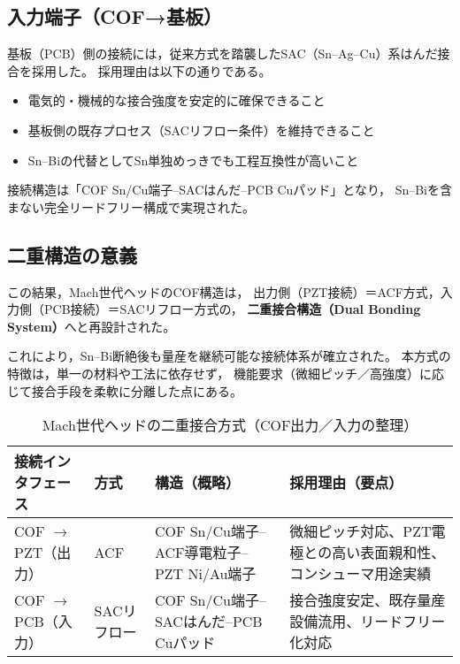 \documentclass[conference]{IEEEtran}
\begin{document}
\subsection{入力端子（COF→基板）}

基板（PCB）側の接続には，従来方式を踏襲したSAC（Sn–Ag–Cu）系はんだ接合を採用した。  
採用理由は以下の通りである。

\begin{itemize}
  \item 電気的・機械的な接合強度を安定的に確保できること  
  \item 基板側の既存プロセス（SACリフロー条件）を維持できること  
  \item Sn–Biの代替としてSn単独めっきでも工程互換性が高いこと
\end{itemize}

接続構造は「COF Sn/Cu端子–SACはんだ–PCB Cuパッド」となり，  
Sn–Biを含まない完全リードフリー構成で実現された。

\subsection{二重構造の意義}

この結果，Mach世代ヘッドのCOF構造は，
出力側（PZT接続）＝ACF方式，入力側（PCB接続）＝SACリフロー方式の，
\textbf{二重接合構造（Dual Bonding System）}へと再設計された。  

これにより，Sn–Bi断絶後も量産を継続可能な接続体系が確立された。  
本方式の特徴は，単一の材料や工法に依存せず，
機能要求（微細ピッチ／高強度）に応じて接合手段を柔軟に分離した点にある。  

\begin{table}[t]
\centering
\footnotesize
\caption{Mach世代ヘッドの二重接合方式（COF出力／入力の整理）}
\label{tab:dual-bond}
\renewcommand{\arraystretch}{1.1}
\begin{tabularx}{\columnwidth}{@{}p{2.1cm} p{1.2cm} Y Y@{}}
\toprule
接続インタフェース & 方式 & 構造（概略） & 採用理由（要点） \\
\midrule
COF $\rightarrow$ PZT（出力） & ACF &
COF Sn/Cu端子–ACF導電粒子–PZT Ni/Au端子 &
微細ピッチ対応、PZT電極との高い表面親和性、コンシューマ用途実績 \\
\addlinespace[2pt]
COF $\rightarrow$ PCB（入力） & SACリフロー &
COF Sn/Cu端子–SACはんだ–PCB Cuパッド &
接合強度安定、既存量産設備流用、リードフリー化対応 \\
\bottomrule
\end{tabularx}
\end{table}
\end{document}
